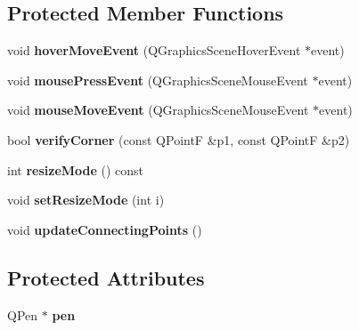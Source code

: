 \subsection*{Protected Member Functions}
\begin{DoxyCompactItemize}
\item 
\hypertarget{class_my_central_graphics_item_a37c26b04ff0579568550e479aca6b4c7}{}void {\bfseries hover\+Move\+Event} (Q\+Graphics\+Scene\+Hover\+Event $\ast$event)\label{class_my_central_graphics_item_a37c26b04ff0579568550e479aca6b4c7}

\item 
\hypertarget{class_my_central_graphics_item_ac2eca49285c8f2058c8faab20ec46b48}{}void {\bfseries mouse\+Press\+Event} (Q\+Graphics\+Scene\+Mouse\+Event $\ast$event)\label{class_my_central_graphics_item_ac2eca49285c8f2058c8faab20ec46b48}

\item 
\hypertarget{class_my_central_graphics_item_a6b3c312c410910a45e0883e728312f3c}{}void {\bfseries mouse\+Move\+Event} (Q\+Graphics\+Scene\+Mouse\+Event $\ast$event)\label{class_my_central_graphics_item_a6b3c312c410910a45e0883e728312f3c}

\item 
\hypertarget{class_my_central_graphics_item_aa0d27bc8f661136a54a61e12d79e2386}{}bool {\bfseries verify\+Corner} (const Q\+Point\+F \&p1, const Q\+Point\+F \&p2)\label{class_my_central_graphics_item_aa0d27bc8f661136a54a61e12d79e2386}

\item 
\hypertarget{class_my_central_graphics_item_a7616ccc14383191dd0c69a0a3b3e4e2c}{}int {\bfseries resize\+Mode} () const \label{class_my_central_graphics_item_a7616ccc14383191dd0c69a0a3b3e4e2c}

\item 
\hypertarget{class_my_central_graphics_item_a37551f69c8e31e601036ceef0cc16a40}{}void {\bfseries set\+Resize\+Mode} (int i)\label{class_my_central_graphics_item_a37551f69c8e31e601036ceef0cc16a40}

\item 
\hypertarget{class_my_central_graphics_item_a3b8c5b13546c1f1e9eba541abe1aa89c}{}void {\bfseries update\+Connecting\+Points} ()\label{class_my_central_graphics_item_a3b8c5b13546c1f1e9eba541abe1aa89c}

\end{DoxyCompactItemize}
\subsection*{Protected Attributes}
\begin{DoxyCompactItemize}
\item 
\hypertarget{class_my_central_graphics_item_a64d9cd163863d34aa141ce8103dd8ec0}{}Q\+Pen $\ast$ {\bfseries pen}\label{class_my_central_graphics_item_a64d9cd163863d34aa141ce8103dd8ec0}

\end{DoxyCompactItemize}
